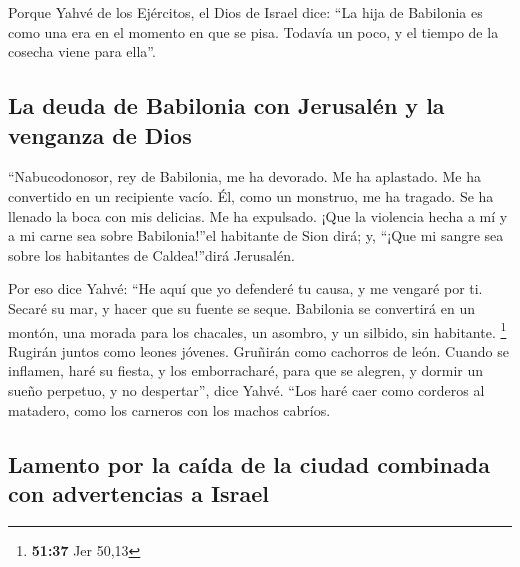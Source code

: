  Porque Yahvé de los Ejércitos, el Dios de Israel dice:
``La hija de Babilonia es como una era en el momento en que se pisa.
Todavía un poco, y el tiempo de la cosecha viene para ella''.

\hypertarget{la-deuda-de-babilonia-con-jerusaluxe9n-y-la-venganza-de-dios}{%
\subsection{La deuda de Babilonia con Jerusalén y la venganza de
Dios}\label{la-deuda-de-babilonia-con-jerusaluxe9n-y-la-venganza-de-dios}}

 ``Nabucodonosor, rey de Babilonia, me ha devorado. Me ha
aplastado. Me ha convertido en un recipiente vacío. Él, como un
monstruo, me ha tragado. Se ha llenado la boca con mis delicias. Me ha
expulsado.  ¡Que la violencia hecha a mí y a mi carne sea
sobre Babilonia!''el habitante de Sion dirá; y, ``¡Que mi sangre sea
sobre los habitantes de Caldea!''dirá Jerusalén.

 Por eso dice Yahvé: ``He aquí que yo defenderé tu causa,
y me vengaré por ti. Secaré su mar, y hacer que su fuente se seque.
 Babilonia se convertirá en un montón, una morada para
los chacales, un asombro, y un silbido, sin habitante. \footnote{\textbf{51:37}
  Jer 50,13}  Rugirán juntos como leones jóvenes.
Gruñirán como cachorros de león.  Cuando se inflamen,
haré su fiesta, y los emborracharé, para que se alegren, y dormir un
sueño perpetuo, y no despertar'', dice Yahvé.  ``Los haré
caer como corderos al matadero, como los carneros con los machos
cabríos.

\hypertarget{lamento-por-la-cauxedda-de-la-ciudad-combinada-con-advertencias-a-israel}{%
\subsection{Lamento por la caída de la ciudad combinada con advertencias
a
Israel}\label{lamento-por-la-cauxedda-de-la-ciudad-combinada-con-advertencias-a-israel}}

